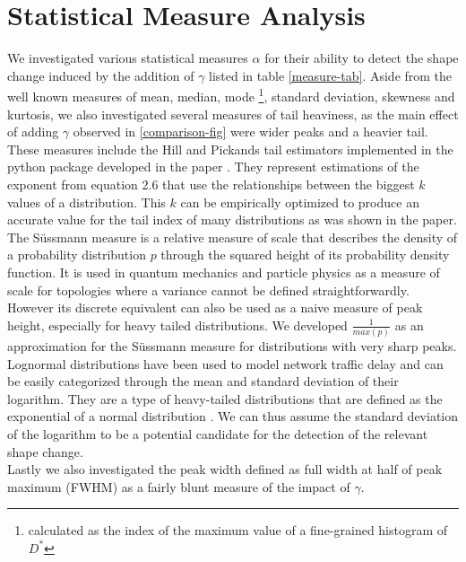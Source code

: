\documentclass[12pt,a4paper,automark, toc=bib]{scrreprt}
\theoremstyle{definition}
\begin{document}
		\section{Statistical Measure Analysis}
		
		\label{measure-list}
		We investigated various statistical measures $\alpha$ for their ability to detect the shape change induced by the addition of $\gamma$ listed in table \ref{measure-tab}. Aside from the  well known measures of mean, median, mode \footnote{calculated as the index of the maximum value of a fine-grained histogram of $D^*$}, standard deviation, skewness and kurtosis, we also investigated several measures of tail heaviness, as the main effect of adding $\gamma$ observed in \ref{comparison-fig} were wider peaks and a heavier tail. \\
		These measures include the Hill \cite{Cooke2011} and Pickands \cite{Pickands1975} tail estimators implemented in the python package developed in the paper \cite{Voitalov2019}. They represent estimations of the exponent from equation 2.6 that use the relationships between the biggest $k$ values of a distribution. This $k$ can be empirically optimized to produce an accurate value for the tail index of many distributions as was shown in the paper.\\
		The Süssmann measure \cite{Sussmann1997} is a relative measure of scale that describes the density of a probability distribution $p$ through the squared height of its probability density function. It is used in quantum mechanics and particle physics as a measure of scale for topologies where a variance cannot be defined straightforwardly. However its discrete equivalent can also be used as a naive measure of peak height, especially for heavy tailed distributions. We developed $\frac{1}{max(p)}$ as an approximation for the Süssmann measure for distributions with very sharp peaks. \\
		Lognormal distributions have been used to model network traffic delay  \cite{Pfitzinger2018a} and can be easily categorized through the mean and standard deviation of their logarithm. They are a type of heavy-tailed distributions that are defined as the exponential of a normal distribution \cite{Cooke2011}. We can thus assume the standard deviation of the logarithm to be a potential candidate for the detection of the relevant shape change.\\ 
		Lastly we also investigated the peak width defined as full width at half of peak maximum (FWHM) as a fairly blunt measure of the impact of $\gamma$. 
\end{document}
